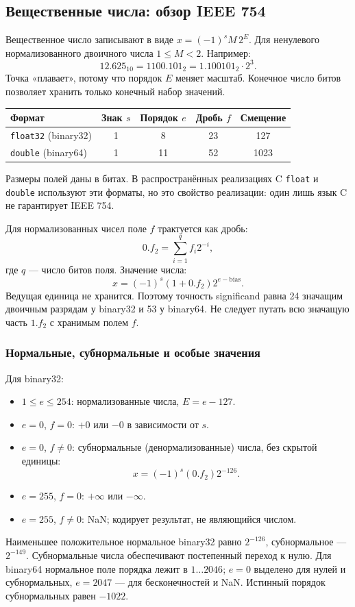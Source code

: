 \subsection{Вещественные числа: обзор IEEE 754}
\label{lecture02-float}
Вещественное число записывают в виде $x=(-1)^s M\,2^E$.
Для ненулевого нормализованного двоичного числа $1\le M<2$.
Например:
\[12.625_{10}=1100.101_2=1.100101_2\cdot2^3.\]
Точка «плавает», потому что порядок $E$ меняет масштаб.
Конечное число битов позволяет хранить только конечный набор значений.

\begin{center}
\begin{tabular}{|l|c|c|c|c|}
\hline
Формат & Знак $s$ & Порядок $e$ & Дробь $f$ & Смещение \\
\hline
\texttt{float32} (binary32) & 1 & 8 & 23 & 127 \\
\texttt{double} (binary64) & 1 & 11 & 52 & 1023 \\
\hline
\end{tabular}
\end{center}
Размеры полей даны в битах. В распространённых реализациях C
\texttt{float} и \texttt{double} используют эти форматы, но это
свойство реализации: один лишь язык C не гарантирует IEEE 754.

Для нормализованных чисел поле $f$ трактуется как дробь:
\[0.f_2=\sum_{i=1}^{q} f_i2^{-i},\]
где $q$ --- число битов поля. Значение числа:
\[
x=(-1)^s(1+0.f_2)2^{e-\mathrm{bias}}.
\]
Ведущая единица не хранится. Поэтому точность significand равна 24
значащим двоичным разрядам у binary32 и 53 у binary64.
Не следует путать всю значащую часть $1.f_2$ с хранимым полем $f$.

\subsubsection*{Нормальные, субнормальные и особые значения}
Для binary32:
\begin{itemize}
    \item $1\le e\le254$: нормализованные числа, $E=e-127$.
    \item $e=0$, $f=0$: $+0$ или $-0$ в зависимости от $s$.
    \item $e=0$, $f\ne0$: субнормальные (денормализованные) числа,
    без скрытой единицы:
    \[x=(-1)^s(0.f_2)2^{-126}.\]
    \item $e=255$, $f=0$: $+\infty$ или $-\infty$.
    \item $e=255$, $f\ne0$: NaN; кодирует результат, не являющийся числом.
\end{itemize}
Наименьшее положительное нормальное binary32 равно $2^{-126}$,
субнормальное --- $2^{-149}$. Субнормальные числа обеспечивают
постепенный переход к нулю.
Для binary64 нормальное поле порядка лежит в $1\ldots2046$;
$e=0$ выделено для нулей и субнормальных, $e=2047$ --- для бесконечностей
и NaN. Истинный порядок субнормальных равен $-1022$.

